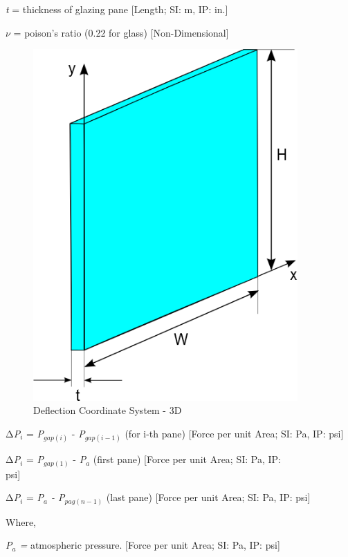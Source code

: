\emph{t} = thickness of glazing pane {[}Length; SI: m, IP: in.{]}

$\nu$ = poison's ratio (0.22 for glass) {[}Non-Dimensional{]}

\begin{figure}[hbtp] %
\centering
\includegraphics[width=0.9\textwidth, height=0.9\textheight, keepaspectratio=true]{media/image1782.png}
\caption{Deflection Coordinate System - 3D \protect \label{fig:deflection-coordinate-system-3d}}
\end{figure}

Δ\emph{P\(_{i}\)} = \emph{P\(_{gap(i)}\)} - \emph{P\(_{gap(i-1)}\)} (for i-th pane) {[}Force per unit Area; SI: Pa, IP: psi{]}

Δ\emph{P\(_{i}\)} = \emph{P\(_{gap(1)}\)} - \emph{P\(_{a}\)} (first pane) {[}Force per unit Area; SI: Pa, IP: psi{]}\emph{~~~~~~~~~~~~~~~~~~}

Δ\emph{P\(_{i}\)} = \emph{P\(_{a}\) - P\(_{pag(n-1)}\)} (last pane) {[}Force per unit Area; SI: Pa, IP: psi{]}

Where,

\emph{P\(_{a}\) =} atmospheric pressure. {[}Force per unit Area; SI: Pa, IP: psi{]}

